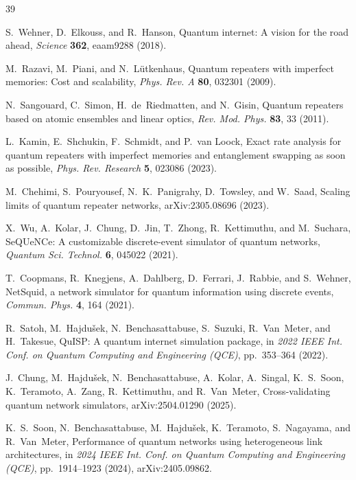\documentclass[quantumrep,article,submit,moreauthors]{Definitions/mdpi}
\begin{document}
\begin{thebibliography}{39}

S.~Wehner, D.~Elkouss, and R.~Hanson,
Quantum internet: A vision for the road ahead,
\textit{Science} \textbf{362}, eaam9288 (2018).

M.~Razavi, M.~Piani, and N.~L{\"u}tkenhaus,
Quantum repeaters with imperfect memories: Cost and scalability,
\textit{Phys. Rev. A} \textbf{80}, 032301 (2009).

N.~Sangouard, C.~Simon, H.~de~Riedmatten, and N.~Gisin,
Quantum repeaters based on atomic ensembles and linear optics,
\textit{Rev. Mod. Phys.} \textbf{83}, 33 (2011).

L.~Kamin, E.~Shchukin, F.~Schmidt, and P.~van Loock,
Exact rate analysis for quantum repeaters with imperfect memories and entanglement swapping as soon as possible,
\textit{Phys. Rev. Research} \textbf{5}, 023086 (2023).

M.~Chehimi, S.~Pouryousef, N.~K.~Panigrahy, D.~Towsley, and W.~Saad,
Scaling limits of quantum repeater networks,
arXiv:2305.08696 (2023).

X.~Wu, A.~Kolar, J.~Chung, D.~Jin, T.~Zhong, R.~Kettimuthu, and M.~Suchara,
SeQUeNCe: A customizable discrete-event simulator of quantum networks,
\textit{Quantum Sci. Technol.} \textbf{6}, 045022 (2021).

T.~Coopmans, R.~Knegjens, A.~Dahlberg, D.~Ferrari, J.~Rabbie, and S.~Wehner,
NetSquid, a network simulator for quantum information using discrete events,
\textit{Commun. Phys.} \textbf{4}, 164 (2021).

R.~Satoh, M.~Hajdu{\v{s}}ek, N.~Benchasattabuse, S.~Suzuki, R.~Van~Meter, and H.~Takesue,
QuISP: A quantum internet simulation package,
in \textit{2022 IEEE Int. Conf. on Quantum Computing and Engineering (QCE)}, pp.~353--364 (2022).

J.~Chung, M.~Hajdu\v{s}ek, N.~Benchasattabuse, A.~Kolar, A.~Singal, K.~S.~Soon, K.~Teramoto, A.~Zang, R.~Kettimuthu, and R.~Van~Meter,
Cross-validating quantum network simulators,
arXiv:2504.01290 (2025).

K.~S.~Soon, N.~Benchasattabuse, M.~Hajdu\v{s}ek, K.~Teramoto, S.~Nagayama, and R.~Van~Meter,
Performance of quantum networks using heterogeneous link architectures,
in \textit{2024 IEEE Int. Conf. on Quantum Computing and Engineering (QCE)}, pp.~1914--1923 (2024), arXiv:2405.09862.


\end{thebibliography}
\end{document}
